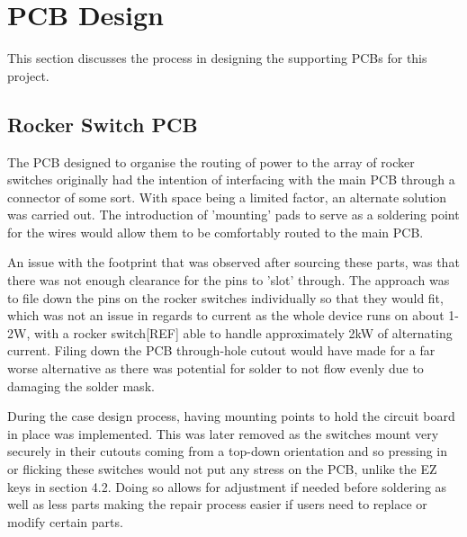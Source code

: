 
\section{PCB Design}
This section discusses the process in designing the supporting PCBs for this project.


\subsection{Rocker Switch PCB}

The PCB designed to organise the routing of power to the array of rocker switches originally had the intention of interfacing with the main PCB through a connector of some sort.
With space being a limited factor, an alternate solution was carried out.
The introduction of 'mounting' pads to serve as a soldering point for the wires would allow them to be comfortably routed to the main PCB.

An issue with the footprint that was observed after sourcing these parts, was that there was not enough clearance for the pins to 'slot' through.
The approach was to file down the pins on the rocker switches individually so that they would fit, which was not an issue in regards to current as the whole device runs on about 1-2W, with a rocker switch[REF] able to handle approximately 2kW of alternating current.
Filing down the PCB through-hole cutout would have made for a far worse alternative as there was potential for solder to not flow evenly due to damaging the solder mask. %

During the case design process, having mounting points to hold the circuit board in place was implemented.
This was later removed as the switches mount very securely in their cutouts coming from a top-down orientation and so pressing in or flicking these switches would not put any stress on the PCB, unlike the EZ keys in section 4.2.
Doing so allows for adjustment if needed before soldering as well as less parts making the repair process easier if users need to replace or modify certain parts.

